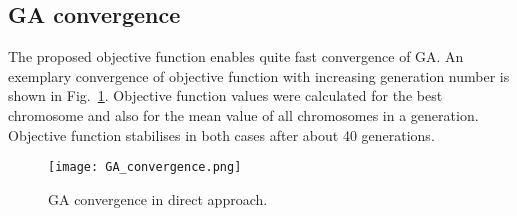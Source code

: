 \documentclass[preprint,12pt]{elsarticle}
\begin{document}
\subsection{GA convergence}
The proposed objective function enables quite fast convergence of GA. An exemplary convergence of objective function with increasing generation number is shown in Fig.~\ref{fig:GAconvergence}. Objective function values were calculated for the best chromosome and also for the mean value of all chromosomes in a generation. Objective function stabilises in both cases after about 40 generations.
	\begin{figure} [h!]
		\centering
		\texttt{[image: GA\_convergence.png]}
		\caption{GA convergence in direct approach.}
		\label{fig:GAconvergence}
	\end{figure}
\end{document}
